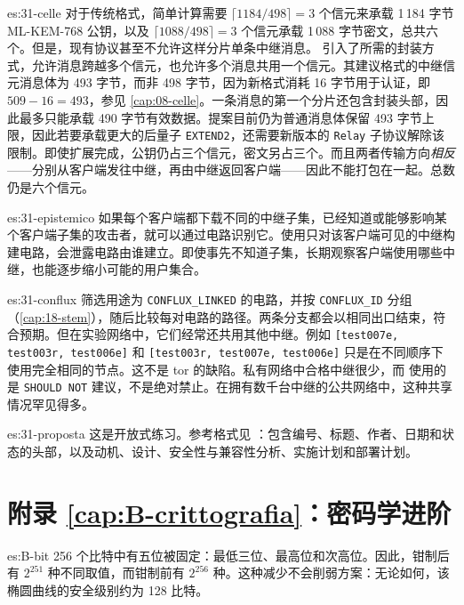 \begin{soluzione}{es:31-celle}
对于传统格式，简单计算需要 $\lceil1184/498\rceil=3$ 个信元来承载 1\,184 字节 ML-KEM-768 公钥，以及 $\lceil1088/498\rceil=3$ 个信元承载 1\,088 字节密文，总共六个。但是，现有协议甚至不允许这样分片单条中继消息。 引入了所需的封装方式，允许消息跨越多个信元，也允许多个消息共用一个信元。其建议格式的中继信元消息体为 493 字节，而非 498 字节，因为新格式消耗 16 字节用于认证，即 $509-16=493$，参见 \cref{cap:08-celle}。一条消息的第一个分片还包含封装头部，因此最多只能承载 490 字节有效数据。提案目前仍为普通消息体保留 493 字节上限，因此若要承载更大的后量子 \texttt{EXTEND2}，还需要新版本的 \texttt{Relay} 子协议解除该限制。即使扩展完成，公钥仍占三个信元，密文另占三个。而且两者传输方向\emph{相反}——分别从客户端发往中继，再由中继返回客户端——因此不能打包在一起。总数仍是六个信元。
\end{soluzione}

\begin{soluzione}{es:31-epistemico}
如果每个客户端都下载不同的中继子集，已经知道或能够影响某个客户端子集的攻击者，就可以通过电路识别它。使用只对该客户端可见的中继构建电路，会泄露电路由谁建立。即使事先不知道子集，长期观察客户端使用哪些中继，也能逐步缩小可能的用户集合。
\end{soluzione}

\begin{soluzione}{es:31-conflux}
筛选用途为 \texttt{CONFLUX\_LINKED} 的电路，并按 \texttt{CONFLUX\_ID} 分组（\cref{cap:18-stem}），随后比较每对电路的路径。两条分支都会以相同出口结束，符合预期。但在实验网络中，它们经常还共用其他中继。例如 \texttt{[test007e, test003r, test006e]} 和 \texttt{[test003r, test007e, test006e]} 只是在不同顺序下使用完全相同的节点。这不是 tor 的缺陷。私有网络中合格中继很少，而  使用的是 \texttt{SHOULD NOT} 建议，不是绝对禁止。在拥有数千台中继的公共网络中，这种共享情况罕见得多。
\end{soluzione}

\begin{soluzione}{es:31-proposta}
这是开放式练习。参考格式见 ：包含编号、标题、作者、日期和状态的头部，以及动机、设计、安全性与兼容性分析、实施计划和部署计划。
\end{soluzione}

\section*{附录 \ref{cap:B-crittografia}：密码学进阶}

\begin{soluzione}{es:B-bit}
256 个比特中有五位被固定：最低三位、最高位和次高位。因此，钳制后有 $2^{251}$ 种不同取值，而钳制前有 $2^{256}$ 种。这种减少不会削弱方案：无论如何，该椭圆曲线的安全级别约为 128 比特。
\end{soluzione}

